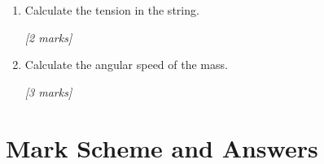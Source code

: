 \begin{tcolorbox}[colback=white, colframe=midblue, breakable]
\begin{enumerate}[label=(\alph*)]
  \item \begin{minipage}[t]{\linewidth}
  Calculate the tension in the string.
  \par\hfill\textit{[2 marks]}
  \vspace{3.0cm}
  \end{minipage}

  \item \begin{minipage}[t]{\linewidth}
  Calculate the angular speed of the mass.
  \par\hfill\textit{[3 marks]}
  \vspace{4.0cm}
  \end{minipage}
\end{enumerate}

\end{tcolorbox}

\section{Mark Scheme and Answers}

